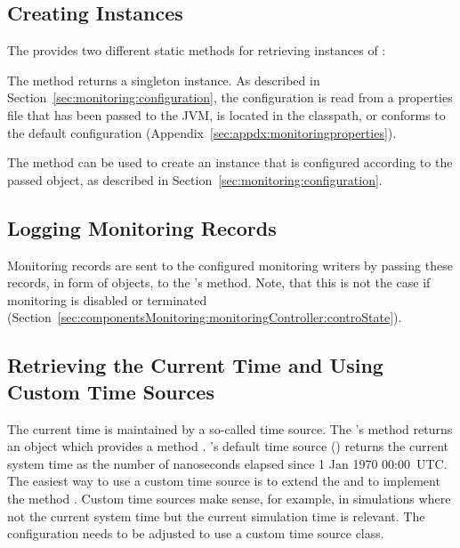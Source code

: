 \subsection{Creating  Instances}\label{sec:componentsMonitoring:monitoringController:factory}

The  provides two different static methods for retrieving instances of %
:\\

\begin{compactenum}
 \item The method  returns a singleton instance. %
As described in Section~\ref{sec:monitoring:configuration}, the configuration is read from %
a properties file that has been passed to the JVM, is located in the classpath, or %
conforms to the default configuration (Appendix~\ref{sec:appdx:monitoringproperties}). %
 \item The method  can be used to create %
an instance that is configured according to the passed  object, %
as described in Section~\ref{sec:monitoring:configuration}.
\end{compactenum}

\subsection{Logging Monitoring Records}\label{sec:componentsMonitoring:monitoringController:logging}

Monitoring records are sent to the configured monitoring writers by passing %
these records, in form of  objects, to the %
's  method.  %
Note, that this is not the case if monitoring is disabled or terminated (Section~\ref{sec:componentsMonitoring:monitoringController:controState}). 

\subsection{Retrieving the Current Time and Using Custom Time Sources}\label{sec:componentsMonitoring:monitoringController:getTime}

The current time is maintained by a so-called time source. The 's method %
 returns an  object which provides a method %
. \Kieker{}'s default time source () returns the current system %
time as the number of nanoseconds elapsed since 1 Jan 1970 00:00~UTC. %
The easiest way to use a custom time source is to extend the  and %
to implement the method . Custom time sources make sense, for example, %
in simulations where not the current system time but the current simulation time is %
relevant. The configuration needs to be adjusted to use a custom time source class. %

